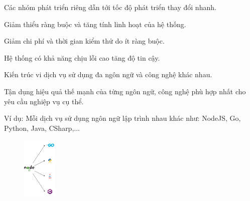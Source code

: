 
Các nhóm phát triển riêng dẫn tới tốc độ phát triển thay đổi nhanh.

Giảm thiểu ràng buộc và tăng tính linh hoạt của hệ thống.

Giảm chi phí và thời gian kiểm thử do ít ràng buộc.

Hệ thống có khả năng chịu lỗi cao tăng độ tin cậy.

Kiến trúc vi dịch vụ sử dụng đa ngôn ngữ và công nghệ khác nhau.

Tận dụng hiệu quả thế mạnh của từng ngôn ngữ, công nghệ phù hợp nhất cho yêu cầu nghiệp vụ cụ thể.

Ví dụ: Mỗi dịch vụ sử dụng ngôn ngữ lập trình nhau khác như: NodeJS, Go, Python, Java, CSharp,...

\begin{figure}[h]

\centering

\includegraphics[height = 3cm]{pictures/DaNgonNgu/_DaNgonNgu.png}


\end{figure}

